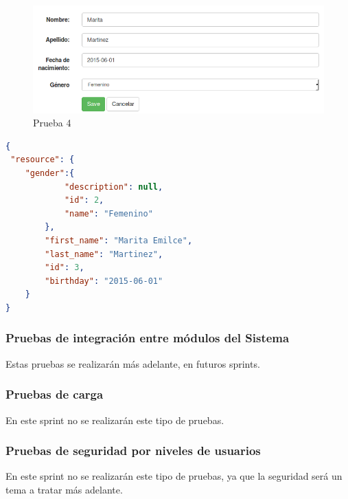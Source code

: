 {\begin{figure}[h]
  \centering
  \includegraphics[width=.8\textwidth]{img/tp1_parte2/1-prueba_4}
  \caption{Prueba 4}
  \label{prueba4}
\end{figure}

\begin{lstlisting}[language=json,firstnumber=1,  breaklines=true, caption= Json del perfil id:3 modificado, label=JsonProfile]
{
 "resource": {
    "gender":{
            "description": null,
            "id": 2,
            "name": "Femenino"
        },
        "first_name": "Marita Emilce",
        "last_name": "Martinez",
        "id": 3,
        "birthday": "2015-06-01"
    }
}
\end{lstlisting}
}
\clearpage
    
    


    
    \clearpage
\subsubsection{Pruebas  de  integración entre módulos del Sistema}
Estas pruebas se realizarán más adelante, en futuros sprints.
\subsubsection{ Pruebas de carga}
En este sprint no se realizarán este tipo de pruebas.
\subsubsection{ Pruebas de seguridad por niveles de usuarios}
En este sprint no se realizarán este tipo de pruebas, ya que la seguridad será un tema a tratar más adelante.

